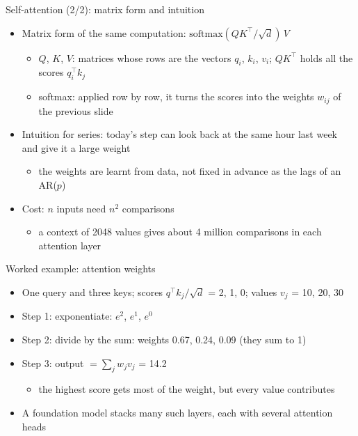 \begin{frame}{Self-attention (2/2): matrix form and intuition}
\itemsize{\small}
\begin{itemize}
    \item Matrix form of the same computation: $\text{softmax}(QK^\top/\sqrt{d})\,V$
    \begin{itemize}
        \item $Q$, $K$, $V$: matrices whose rows are the vectors $q_i$, $k_i$, $v_i$; $QK^\top$ holds all the scores $q_i^\top k_j$
        \item softmax: applied row by row, it turns the scores into the weights $w_{ij}$ of the previous slide
    \end{itemize}
    \item Intuition for series: today's step can look back at the same hour last week and give it a large weight
    \begin{itemize}
        \item the weights are learnt from data, not fixed in advance as the lags of an AR($p$)
    \end{itemize}
    \item Cost: $n$ inputs need $n^2$ comparisons
    \begin{itemize}
        \item a context of 2048 values gives about 4 million comparisons in each attention layer
    \end{itemize}
\end{itemize}
\end{frame}

\begin{frame}{Worked example: attention weights}
\itemsize{\small}
\begin{itemize}
    \item One query and three keys; scores $q^\top k_j/\sqrt{d}$ = 2, 1, 0; values $v_j$ = 10, 20, 30
    \item Step 1: exponentiate: $e^2$, $e^1$, $e^0$
    \item Step 2: divide by the sum: weights 0.67, 0.24, 0.09 (they sum to 1)
    \item Step 3: output $= \sum_j w_j v_j$ = 14.2
    \begin{itemize}
        \item the highest score gets most of the weight, but every value contributes
    \end{itemize}
    \item A foundation model stacks many such layers, each with several attention heads
\end{itemize}
\end{frame}

